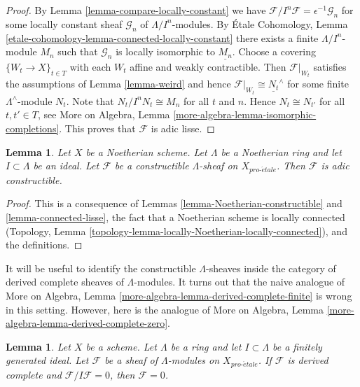 \documentclass{stacks-project}
\theoremstyle{plain}
\newtheorem{lemma}[subsection]{Lemma}
\theoremstyle{definition}
\theoremstyle{remark}
\numberwithin{equation}{subsection}
\def\proetale{{pro\text{-}\acute{e}tale}}
\begin{document}
\begin{proof}
By Lemma \ref{lemma-compare-locally-constant} we have
$\mathcal{F}/I^n\mathcal{F} = \epsilon^{-1}\mathcal{G}_n$
for some locally constant sheaf $\mathcal{G}_n$ of $\Lambda/I^n$-modules. By
\'Etale Cohomology, Lemma
\ref{etale-cohomology-lemma-connected-locally-constant}
there exists a finite $\Lambda/I^n$-module $M_n$ such that
$\mathcal{G}_n$ is locally isomorphic to $\underline{M_n}$.
Choose a covering $\{W_t \to X\}_{t \in T}$ with each $W_t$
affine and weakly contractible.
Then $\mathcal{F}|_{W_t}$ satisfies the assumptions of
Lemma \ref{lemma-weird}
and hence $\mathcal{F}|_{W_t} \cong \underline{N_t}^\wedge$
for some finite $\Lambda^\wedge$-module $N_t$. Note that
$N_t/I^nN_t \cong M_n$ for all $t$ and $n$. Hence
$N_t \cong N_{t'}$ for all $t, t' \in T$, see
More on Algebra, Lemma \ref{more-algebra-lemma-isomorphic-completions}.
This proves that $\mathcal{F}$ is adic lisse.
\end{proof}

\begin{lemma}
\label{lemma-Noetherian-adic-constructible}
Let $X$ be a Noetherian scheme. Let $\Lambda$ be a Noetherian ring and
let $I \subset \Lambda$ be an ideal. Let $\mathcal{F}$ be a
constructible $\Lambda$-sheaf on $X_\proetale$. Then $\mathcal{F}$
is adic constructible.
\end{lemma}

\begin{proof}
This is a consequence of Lemmas \ref{lemma-Noetherian-constructible} and
\ref{lemma-connected-lisse}, the fact that a Noetherian scheme
is locally connected
(Topology, Lemma \ref{topology-lemma-locally-Noetherian-locally-connected}),
and the definitions.
\end{proof}

\noindent
It will be useful to identify the constructible $\Lambda$-sheaves
inside the category of derived complete sheaves of $\Lambda$-modules.
It turns out that the naive analogue of
More on Algebra, Lemma \ref{more-algebra-lemma-derived-complete-finite}
is wrong in this setting. However, here
is the analogue of More on Algebra, Lemma
\ref{more-algebra-lemma-derived-complete-zero}.

\begin{lemma}
\label{lemma-derived-complete-zero}
Let $X$ be a scheme. Let $\Lambda$ be a ring and let
$I \subset \Lambda$ be a finitely generated ideal.
Let $\mathcal{F}$ be a sheaf of $\Lambda$-modules on $X_\proetale$.
If $\mathcal{F}$ is derived complete and $\mathcal{F}/I\mathcal{F} = 0$,
then $\mathcal{F} = 0$.
\end{lemma}
\end{document}
